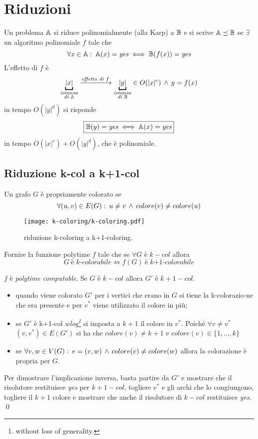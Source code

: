 \section{Riduzioni}
\begin{definition}
	Un problema $\mathbb{A}$ si riduce polinomialmente (alla Karp) a $\mathbb{B}$ e si scrive $\mathbb{A}\preceq\mathbb{B}$ se $\exists$ un algoritmo polinomiale $f$ tale che \[\forall x \in \mathbb{A}\,\colon\, \mathbb{A}(x)=\textit{yes} \iff \mathbb{B}(f(x))=\textit{yes}\] 
	L'effetto di $f$ è
	\[\underbracket{|x|}_{\substack{\textit{istanza}\\\textit{di $\pbc{A}$}}}\xlongrightarrow{\textit{effetto di }f}\underbracket{|y|}_{\substack{\textit{istanza}\\\textit{di $\pbc{B}$}}}\in O(|x|^c)\ive y=f(x)\]
	in tempo $O(|y|^d)$ si risponde \[\boxed{\mathbb{B}(y)=\textit{yes}\iff\mathbb{A}(x)=\textit{yes}}\] in tempo $O(|x|^c)+O(|y|^d)$, che è polinomiale.
\end{definition}
\subsection{Riduzione k-col a k+1-col}
Un grafo $G$ è propriamente colorato se \[\forall (u,v)\in E(G)\,\colon\, u\ne v \,\wedge\, colore(v)\ne colore(u)\]
\begin{demonstration}
	\begin{figure}[thbp]
		\centering
		\texttt{[image: k-coloring/k-coloring.pdf]}
		\caption{riduzione k-coloring a k+1-coloring.}
		\label{fig:k-coloring}
	\end{figure}
	Fornire la funzione polytime $f$ tale che se $\forall G$ è $k-col$ allora \[G\ \textit{è k-colorabile}\iff f(G)\ \textit{è k+1-colorabile}\]
	
	$f$ è \textit{polytime computable}. Se $G$ è $k-col$ allora $G'$ è $k+1-col$. 
	\begin{itemize}
		\item quando viene colorato $G'$ per i vertici che erano in $G$ si tiene la k-colorazio-ne che era presente e per $v^\ast$ viene utilizzato il colore in più; 
		\item se $G'$ è k+1-col \textit{wlog\footnote{without loss of generality.}} si imposta a $k+1$ il colore in $v^\ast$. Poiché $\forall v\ne v^\ast$ $(v,v^\ast)\in E(G')$ si ha che $colore(v)\ne k+1$ e $colore(v)\in\{1,\dots,k\}$
		\item se $\forall v,w\in V(G)\,\colon\, e=(v,w) \,\wedge\, colore(v)\ne colore(w)$ allora la colorazione è propria per $G$.
	\end{itemize}
	Per dimostrare l'implicazione inversa, basta partire da $G'$ e mostrare che il risolutore restituisce \textit{yes} per $k+1-col$, togliere $v^\ast$ e gli archi che lo congiungono, togliere il $k+1$ colore e mostrare che anche il risolutore di $k-col$ restituisce \textit{yes}.
	\qed
\end{demonstration}

